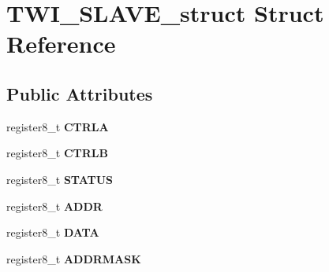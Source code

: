 \hypertarget{struct_t_w_i___s_l_a_v_e__struct}{}\section{T\+W\+I\+\_\+\+S\+L\+A\+V\+E\+\_\+struct Struct Reference}
\label{struct_t_w_i___s_l_a_v_e__struct}
\subsection*{Public Attributes}
\begin{DoxyCompactItemize}
\item 
register8\+\_\+t {\bfseries C\+T\+R\+LA}\hypertarget{struct_t_w_i___s_l_a_v_e__struct_a368e61b5070765979e1d5d8a00687a92}{}\label{struct_t_w_i___s_l_a_v_e__struct_a368e61b5070765979e1d5d8a00687a92}

\item 
register8\+\_\+t {\bfseries C\+T\+R\+LB}\hypertarget{struct_t_w_i___s_l_a_v_e__struct_a42b52363308067436689b8f9d9de05e3}{}\label{struct_t_w_i___s_l_a_v_e__struct_a42b52363308067436689b8f9d9de05e3}

\item 
register8\+\_\+t {\bfseries S\+T\+A\+T\+US}\hypertarget{struct_t_w_i___s_l_a_v_e__struct_a040378c3344b5d83ca9b17edcc208fe5}{}\label{struct_t_w_i___s_l_a_v_e__struct_a040378c3344b5d83ca9b17edcc208fe5}

\item 
register8\+\_\+t {\bfseries A\+D\+DR}\hypertarget{struct_t_w_i___s_l_a_v_e__struct_ab9fb9ebe8412ecb0543868c5b91e23e1}{}\label{struct_t_w_i___s_l_a_v_e__struct_ab9fb9ebe8412ecb0543868c5b91e23e1}

\item 
register8\+\_\+t {\bfseries D\+A\+TA}\hypertarget{struct_t_w_i___s_l_a_v_e__struct_a7a233a95d65c4d866e893aed944853a9}{}\label{struct_t_w_i___s_l_a_v_e__struct_a7a233a95d65c4d866e893aed944853a9}

\item 
register8\+\_\+t {\bfseries A\+D\+D\+R\+M\+A\+SK}\hypertarget{struct_t_w_i___s_l_a_v_e__struct_a2bd9702983b73ea43d8477480f23d01e}{}\label{struct_t_w_i___s_l_a_v_e__struct_a2bd9702983b73ea43d8477480f23d01e}

\end{DoxyCompactItemize}


